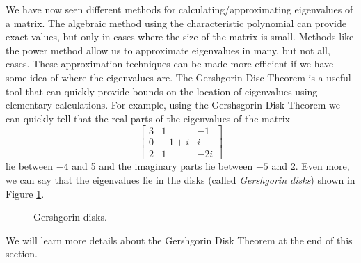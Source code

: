  \label{chap:complex_eigenvalues}

\vspace*{-17 pt}

\vspace*{13 pt}

\label{sec:appl_gershgorin}

We have now seen different methods for calculating/approximating eigenvalues of a matrix. The algebraic method using the characteristic polynomial can provide exact values, but only in cases where the size of the matrix is small. Methods like the power method allow us to approximate eigenvalues in many, but not all, cases. These approximation techniques can be made more efficient if we have some idea of where the eigenvalues are. The Gershgorin Disc Theorem is a useful tool that can quickly provide bounds on the location of eigenvalues using elementary calculations. For example, using the Gershsgorin Disk Theorem we can quickly tell that the real parts of the eigenvalues of the matrix 
\[\left[ \begin{array}{ccr} 3&1&-1 \\ 0&-1+i&i \\ 2&1&-2i \end{array} \right]\]
lie between $-4$ and 5 and the imaginary parts lie between $-5$ and 2. Even more, we can say that the eigenvalues lie in the disks (called \emph{Gershgorin disks}) shown in Figure \ref{F:Gershgorin_1}.
\begin{figure}[ht]
\begin{center}
\end{center}
\caption{Gershgorin disks.}
\label{F:Gershgorin_1}
\end{figure}
We will learn more details about the Gershgorin Disk Theorem at the end of this section. 

